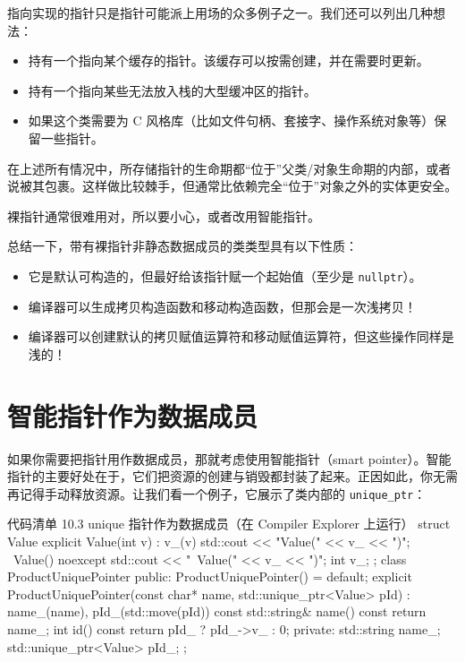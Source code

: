 指向实现的指针只是指针可能派上用场的众多例子之一。我们还可以列出几种想法：

\begin{itemize}
\item 持有一个指向某个缓存的指针。该缓存可以按需创建，并在需要时更新。
\item 持有一个指向某些无法放入栈的大型缓冲区的指针。
\item 如果这个类需要为 C 风格库（比如文件句柄、套接字、操作系统对象等）保留一些指针。
\end{itemize}

在上述所有情况中，所存储指针的生命期都“位于”父类/对象生命期的内部，或者说被其包裹。这样做比较棘手，但通常比依赖完全“位于”对象之外的实体更安全。

\begin{myWarnBox}
裸指针通常很难用对，所以要小心，或者改用智能指针。
\end{myWarnBox}

总结一下，带有裸指针非静态数据成员的类类型具有以下性质：

\begin{itemize}
\item 它是默认可构造的，但最好给该指针赋一个起始值（至少是 \texttt{nullptr}）。
\item 编译器可以生成拷贝构造函数和移动构造函数，但那会是一次浅拷贝！
\item 编译器可以创建默认的拷贝赋值运算符和移动赋值运算符，但这些操作同样是浅的！
\end{itemize}

\section{智能指针作为数据成员}

如果你需要把指针用作数据成员，那就考虑使用智能指针（smart pointer）。智能指针的主要好处在于，它们把资源的创建与销毁都封装了起来。正因如此，你无需再记得手动释放资源。让我们看一个例子，它展示了类内部的 \texttt{unique\_ptr}：


\begin{codeboxt}[cpp]{代码清单 10.3 unique 指针作为数据成员（在 Compiler Explorer 上运行）}
struct Value {
explicit Value(int v) : v_(v) { std::cout << "Value(" << v_ << ")\n"; }
~Value() noexcept { std::cout << "~Value(" << v_ << ")\n"; }
int v_;
};
class ProductUniquePointer {
public:
ProductUniquePointer() = default;
explicit ProductUniquePointer(const char* name,
std::unique_ptr<Value> pId)
: name_(name), pId_(std::move(pId)) { }
const std::string& name() const { return name_; }
int id() const { return pId_ ? pId_->v_ : 0; }
private:
std::string name_;
std::unique_ptr<Value> pId_;
};
\end{codeboxt}

